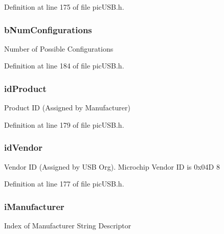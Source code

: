 Definition at line 175 of file pic\-U\-S\-B.\-h.

\hypertarget{struct_u_s_b___device___descriptor_a26db168b352c51f781975b270ee76692}{
\subsubsection[{b\-Num\-Configurations}]{ b\-Num\-Configurations}}\label{struct_u_s_b___device___descriptor_a26db168b352c51f781975b270ee76692}
Number of Possible Configurations 

Definition at line 184 of file pic\-U\-S\-B.\-h.

\hypertarget{struct_u_s_b___device___descriptor_a519c2f3b9ade6de6e761b4ada00d31b9}{
\subsubsection[{id\-Product}]{ id\-Product}}\label{struct_u_s_b___device___descriptor_a519c2f3b9ade6de6e761b4ada00d31b9}
Product I\-D (Assigned by Manufacturer) 

Definition at line 179 of file pic\-U\-S\-B.\-h.

\hypertarget{struct_u_s_b___device___descriptor_a7a7c71d161c32f997811107e4d546ca8}{
\subsubsection[{id\-Vendor}]{ id\-Vendor}}\label{struct_u_s_b___device___descriptor_a7a7c71d161c32f997811107e4d546ca8}
Vendor I\-D (Assigned by U\-S\-B Org). Microchip Vendor I\-D is 0x04\-D 8 

Definition at line 177 of file pic\-U\-S\-B.\-h.

\hypertarget{struct_u_s_b___device___descriptor_aae88465cfdcbe8c3654a5d317ca2a428}{
\subsubsection[{i\-Manufacturer}]{ i\-Manufacturer}}\label{struct_u_s_b___device___descriptor_aae88465cfdcbe8c3654a5d317ca2a428}
Index of Manufacturer String Descriptor 

